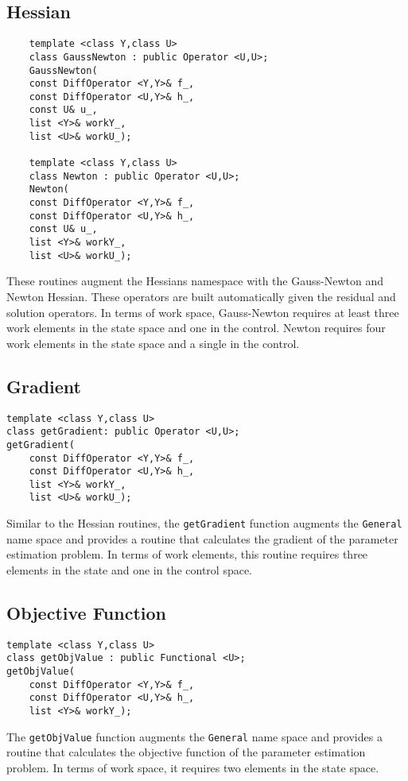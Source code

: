 \documentclass{article}
\begin{document}
\subsection{Hessian}

\begin{flushleft}
\begin{lstlisting}
    template <class Y,class U>
    class GaussNewton : public Operator <U,U>; 
    GaussNewton(
	const DiffOperator <Y,Y>& f_,
	const DiffOperator <U,Y>& h_,
	const U& u_,
	list <Y>& workY_,
	list <U>& workU_);

    template <class Y,class U>
    class Newton : public Operator <U,U>;
    Newton(
	const DiffOperator <Y,Y>& f_,
	const DiffOperator <U,Y>& h_,
	const U& u_,
	list <Y>& workY_,
	list <U>& workU_);
\end{lstlisting}
\end{flushleft}

These routines augment the Hessians namespace with the Gauss-Newton and Newton Hessian.  These operators are built automatically given the residual and solution operators.  In terms of work space, Gauss-Newton requires at least three work elements in the state space and one in the control.  Newton requires four work elements in the state space and a single in the control.

\subsection{Gradient}

\begin{flushleft}
\begin{lstlisting}
template <class Y,class U>
class getGradient: public Operator <U,U>;
getGradient(
    const DiffOperator <Y,Y>& f_,
    const DiffOperator <U,Y>& h_,
    list <Y>& workY_,
    list <U>& workU_); 
\end{lstlisting}
\end{flushleft}
Similar to the Hessian routines, the \texttt{getGradient} function augments the \texttt{General} name space and provides a routine that calculates the gradient of the parameter estimation problem.  In terms of work elements, this routine requires three elements in the state and one in the control space.

\subsection{Objective Function}

\begin{flushleft}
\begin{lstlisting}
template <class Y,class U>
class getObjValue : public Functional <U>; 
getObjValue(
    const DiffOperator <Y,Y>& f_,
    const DiffOperator <U,Y>& h_,
    list <Y>& workY_);
\end{lstlisting}
\end{flushleft}

The \texttt{getObjValue} function augments the \texttt{General} name space and provides a routine that calculates the objective function of the parameter estimation problem.  In terms of work space, it requires two elements in the state space.
\end{document}
